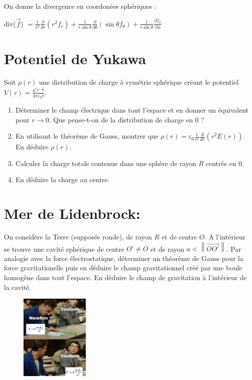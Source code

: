 \documentclass{article}
\begin{document}
On donne la divergence en coordonées sphériques : 

div($\vec{f}$) $=\frac{1}{r^2} \frac{\partial}{\partial r}(r^2 f_r) + \frac{1}{r \sin \theta} \frac{\partial}{\partial \theta}(\sin \theta f_\theta) + \frac{1}{r \sin \theta} \frac{\partial f_\phi}{\partial \phi}$

\section{Potentiel de Yukawa} 
Soit $\rho(r)$ une distribution de charge à symétrie sphérique créant le potentiel $V(r) = \frac{q^*e^{-\frac{r}{a}}}{4 \pi \varepsilon_0 r }$.
\begin{enumerate}
    \item Déterminer le champ électrique dans tout l'espace et en donner un équivalent pour $r \rightarrow 0$. Que pense-t-on de la distribution de charge en 0 ? 
    \item En utilisant le théorème de Gauss, montrer que $\rho(r) = \varepsilon_0 \frac{1}{r^2} \frac{d}{dr}(r^2 E(r))$. En déduire $\rho(r)$. 
    \item Calculer la charge totale contenue dans une sphère de rayon $R$ centrée en 0.
    \item En déduire la charge au centre.
\end{enumerate}


\section{Mer de Lidenbrock:}

On considère la Terre (supposée ronde), de rayon $R$ et de centre $O$. A l'intérieur se trouve une cavité sphérique de centre $O' \neq O $ et de rayon $a < \left\lVert \vec{OO'}\right\rVert $. 
Par analogie avec la force électrostatique, déterminer un théorème de Gauss pour la force gravitationelle puis en déduire le champ gravitationnel créé par une boule homogène dans tout l'espace. 
En déduire le champ de gravitation à l'intérieur de la cavité. \\





\begin{figure}[h]
  \centering
  \includegraphics[width=0.3\textwidth]{meme.jpg}
  \label{fig:maison}
\end{figure}
\end{document}
